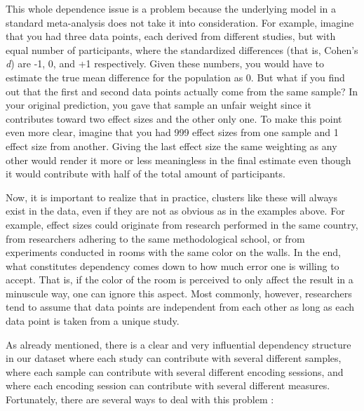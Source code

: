 This whole dependence issue is a problem because the underlying model in a standard meta-analysis does not take it into consideration. For example, imagine that you had three data points, each derived from different studies, but with equal number of participants, where the standardized differences (that is, Cohen's \emph{d}) are -1, 0, and +1 respectively. Given these numbers, you would have to estimate the true mean difference for the population as 0. But what if you find out that the first and second data points actually come from the same sample? In your original prediction, you gave that sample an unfair weight since it contributes toward two effect sizes and the other only one. To make this point even more clear, imagine that you had 999 effect sizes from one sample and 1 effect size from another. Giving the last effect size the same weighting as any other would render it more or less meaningless in the final estimate even though it would contribute with half of the total amount of participants.

Now, it is important to realize that in practice, clusters like these will always exist in the data, even if they are not as obvious as in the examples above. For example, effect sizes could originate from research performed in the same country, from researchers adhering to the same methodological school, or from experiments conducted in rooms with the same color on the walls. In the end, what constitutes dependency comes down to how much error one is willing to accept. That is, if the color of the room is perceived to only affect the result in a minuscule way, one can ignore this aspect. Most commonly, however, researchers tend to assume that data points are independent from each other as long as each data point is taken from a unique study.

As already mentioned, there is a clear and very influential dependency structure in our dataset where each study can contribute with several different samples, where each sample can contribute with several different encoding sessions, and where each encoding session can contribute with several different measures. Fortunately, there are several ways to deal with this problem \parencite{Hedges2010, Scammacca2014}:

